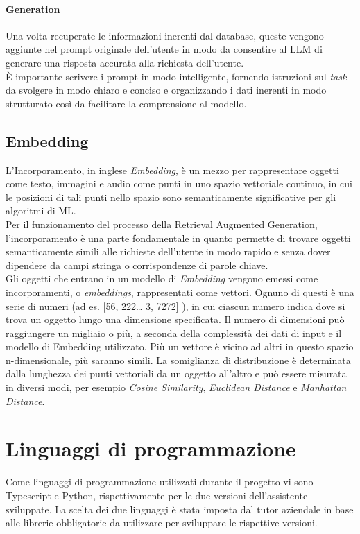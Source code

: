 \paragraph*{Generation}
Una volta recuperate le informazioni inerenti dal database, queste vengono aggiunte nel prompt originale dell'utente in modo da consentire al LLM di generare una risposta accurata alla richiesta dell'utente. \\
È importante scrivere i prompt in modo intelligente, fornendo istruzioni sul \textit{task} da svolgere in modo chiaro e conciso e organizzando i dati inerenti in modo strutturato così da facilitare la comprensione al modello.

\subsection{Embedding}
L'Incorporamento, in inglese \textit{Embedding}, è un mezzo per rappresentare oggetti come testo, immagini e audio come punti in uno spazio vettoriale continuo, in cui le posizioni di tali punti nello spazio sono semanticamente significative per gli algoritmi di ML.\\
Per il funzionamento del processo della Retrieval Augmented Generation, l'incorporamento è una parte fondamentale in quanto permette di trovare oggetti semanticamente simili alle richieste dell'utente in modo rapido e senza dover dipendere da campi stringa o corrispondenze di parole chiave.\\
Gli oggetti che entrano in un modello di \textit{Embedding} vengono emessi come incorporamenti, o \textit{embeddings}, rappresentati come vettori. Ognuno di questi è una serie di numeri (ad es. [56, 222… 3, 7272] ), in cui ciascun numero indica dove si trova un oggetto lungo una dimensione specificata. Il numero di dimensioni può raggiungere un migliaio o più, a seconda della complessità dei dati di input e il modello di Embedding utilizzato. Più un vettore è vicino ad altri in questo spazio n-dimensionale, più saranno simili. La somiglianza di distribuzione è determinata dalla lunghezza dei punti vettoriali da un oggetto all'altro e può essere misurata in diversi modi, per esempio \textit{Cosine Similarity}, \textit{Euclidean Distance} e \textit{Manhattan Distance}.

 
\newpage
\section{Linguaggi di programmazione}
Come linguaggi di programmazione utilizzati durante il progetto vi sono Typescript e Python, rispettivamente per le due versioni dell'assistente sviluppate. La scelta dei due linguaggi è stata imposta dal tutor aziendale in base alle librerie obbligatorie da utilizzare per sviluppare le rispettive versioni.

